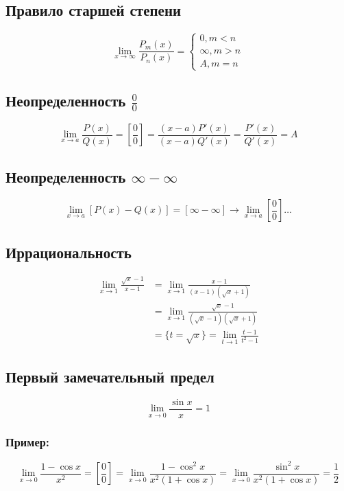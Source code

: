 \documentclass{article}
\begin{document}
\subsection{Правило старшей степени}
\[
	\lim_{x \to \infty} \frac{P_m(x)}{P_n(x)} = \begin{cases}
		0, m < n \\
		\infty, m > n \\
		A, m = n
	\end{cases}
\]

\subsection{Неопределенность $\frac{0}{0}$}
\[
	\lim_{x \to a} \frac{P(x)}{Q(x)} = \left[\frac{0}{0}\right] =
	\frac{(x - a)P'(x)}{(x-a)Q'(x)} = \frac{P'(x)}{Q'(x)} = A
\]

\subsection{Неопределенность $\infty - \infty$}
\[
	\lim_{x \to a} [P(x) - Q(x)] = [\infty - \infty] \rightarrow \lim_{x \to a} \left[\frac{0}{0}\right] \dots
\]

\subsection{Иррациональность}
\begin{align*}
	\lim_{x \to 1} \frac{\sqrt{x} - 1}{x - 1} &= \lim_{x \to 1} \frac{x - 1}{(x - 1)(\sqrt{x} + 1)} \\
	&= \lim_{x \to 1} \frac{\sqrt{x} - 1}{(\sqrt{x} - 1)(\sqrt{x} + 1)} \\
	&= \{ t = \sqrt{x} \} = \lim_{t \to 1} \frac{t - 1}{t^2 - 1}
\end{align*}

\subsection{Первый замечательный предел}
\[
\lim_{x \to 0} \frac{\sin{x}}{x} = 1
\]

\subsubsection*{Пример:}

\[
\lim_{x \to 0} \frac{1 - \cos{x}}{x^2} = \left[\frac{0}{0}\right] =
\lim_{x \to 0} \frac{1 - \cos^2{x}}{x^2(1 + \cos{x})} =
\lim_{x \to 0} \frac{\sin^2{x}}{x^2(1 + \cos{x})} = \frac{1}{2}
\]
\end{document}
